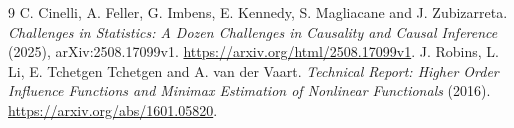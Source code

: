\documentclass[11pt]{article}
\theoremstyle{definition}
\begin{document}
\begin{thebibliography}{9}
 C. Cinelli, A. Feller, G. Imbens, E. Kennedy, S. Magliacane and J. Zubizarreta.
\emph{Challenges in Statistics: A Dozen Challenges in Causality and Causal Inference} (2025), arXiv:2508.17099v1.
\url{https://arxiv.org/html/2508.17099v1}.
 J. Robins, L. Li, E. Tchetgen Tchetgen and A. van der Vaart.
\emph{Technical Report: Higher Order Influence Functions and Minimax Estimation of Nonlinear Functionals} (2016).
\url{https://arxiv.org/abs/1601.05820}.
\end{thebibliography}
\end{document}
